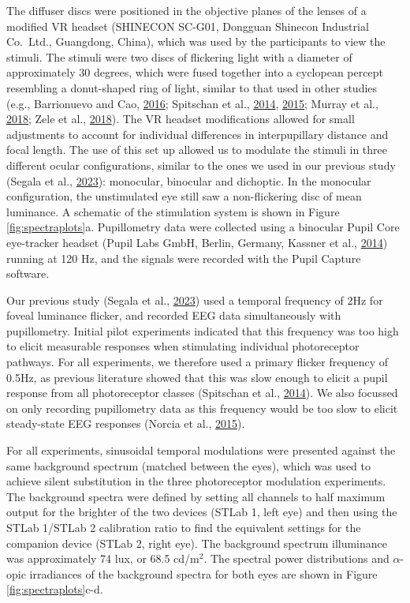 \documentclass[
]{article}
\begin{document}
The diffuser discs were positioned in the objective planes of the lenses of a modified VR headset (SHINECON SC-G01, Dongguan Shinecon Industrial Co.~Ltd., Guangdong, China), which was used by the participants to view the stimuli. The stimuli were two discs of flickering light with a diameter of approximately 30 degrees, which were fused together into a cyclopean percept resembling a donut-shaped ring of light, similar to that used in other studies (e.g., Barrionuevo and Cao, \protect\hyperlink{ref-Barrionuevo2016}{2016}; Spitschan et al., \protect\hyperlink{ref-Spitschan2014}{2014}, \protect\hyperlink{ref-Spitschan2015}{2015}; Murray et al., \protect\hyperlink{ref-Murray2018}{2018}; Zele et al., \protect\hyperlink{ref-Zele2018}{2018}). The VR headset modifications allowed for small adjustments to account for individual differences in interpupillary distance and focal length. The use of this set up allowed us to modulate the stimuli in three different ocular configurations, similar to the ones we used in our previous study (Segala et al., \protect\hyperlink{ref-Segala2023}{2023}): monocular, binocular and dichoptic. In the monocular configuration, the unstimulated eye still saw a non-flickering disc of mean luminance. A schematic of the stimulation system is shown in Figure \ref{fig:spectraplots}a. Pupillometry data were collected using a binocular Pupil Core eye-tracker headset (Pupil Labs GmbH, Berlin, Germany, Kassner et al., \protect\hyperlink{ref-Kassner2014}{2014}) running at 120 Hz, and the signals were recorded with the Pupil Capture software.

Our previous study (Segala et al., \protect\hyperlink{ref-Segala2023}{2023}) used a temporal frequency of 2Hz for foveal luminance flicker, and recorded EEG data simultaneously with pupillometry. Initial pilot experiments indicated that this frequency was too high to elicit measurable responses when stimulating individual photoreceptor pathways. For all experiments, we therefore used a primary flicker frequency of 0.5Hz, as previous literature showed that this was slow enough to elicit a pupil response from all photoreceptor classes (Spitschan et al., \protect\hyperlink{ref-Spitschan2014}{2014}). We also focussed on only recording pupillometry data as this frequency would be too slow to elicit steady-state EEG responses (Norcia et al., \protect\hyperlink{ref-Norcia2015}{2015}).

For all experiments, sinusoidal temporal modulations were presented against the same background spectrum (matched between the eyes), which was used to achieve silent substitution in the three photoreceptor modulation experiments. The background spectra were defined by setting all channels to half maximum output for the brighter of the two devices (STLab 1, left eye) and then using the STLab 1/STLab 2 calibration ratio to find the equivalent settings for the companion device (STLab 2, right eye). The background spectrum illuminance was approximately 74 lux, or 68.5 cd/m\(^2\). The spectral power distributions and \(\alpha\)-opic irradiances of the background spectra for both eyes are shown in Figure \ref{fig:spectraplots}c-d.
\end{document}
